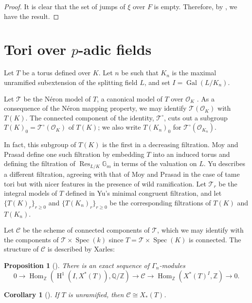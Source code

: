 \documentclass[11pt]{amsart}
\theoremstyle{plain}
\newtheorem{proposition}[theorem]{Proposition}
\newtheorem{corollary}[theorem]{Corollary}
\theoremstyle{definition}
\DeclareMathOperator{\Gal}{Gal}
\DeclareMathOperator{\HH}{H}
\DeclareMathOperator{\Hom}{Hom}
\DeclareMathOperator{\Spec}{Spec}
\DeclareMathOperator{\Res}{Res}
\newcommand{\TT}{\mathcal{T}}
\newcommand{\C}{\mathcal{C}}
\newcommand{\OK}{\mathcal{O}_K}
\newcommand{\OKn}{\mathcal{O}_{K_n}}
\newcommand{\ZZ}{\mathbb{Z}}
\newcommand{\QQ}{\mathbb{Q}}
\newcommand{\Gm}{\mathbb{G}_m}
\begin{document}
\begin{proof}
It is clear that the set of jumps of $\xi$ over $F$ is empty.
Therefore, by \cite[Proposition 21]{bushnell-henniart:10a}, we have the result.
\end{proof}

\section{Tori over $p$-adic fields} \label{section:padic_tori}

Let $T$ be a torus defined over $K$.    Let $n$ be such that $K_n$ is the maximal
unramified subextension of the splitting field $L$, and set $I = \Gal(L/K_n)$.

Let $\TT$ be the N\'eron model of $T$, a canonical model of $T$
over $\OK$ \cite[Ch. 10]{bosch-lutkebohmert-reynaud:NeronModels}.  As a consequence of the N\'eron mapping
property, we may identify $\TT(\OK)$ with $T(K)$.  The connected
component of the identity, $\TT^\circ$, cuts out a subgroup
$T(K)_0 = \TT^\circ(\OK)$ of $T(K)$; we also write $T(K_n)_0$ for
$\TT^\circ(\OKn)$.

In fact, this subgroup of $T(K)$ is the first in a decreasing filtration.
Moy and Prasad \cite{moy-prasad:96a}
define one such filtration by
embedding $T$ into an induced torus and defining the filtration of
$\Res_{L/K} \Gm$ in terms of the valuation on $L$.  Yu \cite[\S 5]{yu:03a}
describes a different filtration, agreeing with that of Moy and Prasad
in the case of tame tori but with nicer features in the presence of wild
ramification.  Let $\TT_r$ be the integral models of $T$ defined in Yu's
minimal congruent filtration, and let $\{T(K)_r\}_{r \ge 0}$ and
$\{T(K_n)_r\}_{r \ge 0}$ be the corresponding filtrations of $T(K)$ and
$T(K_n)$.

Let $\C$ be the scheme of
connected components of $\TT$,
which we may identify with the
components of $\TT \times \Spec(k)$ since $T = \TT \times \Spec(K)$
is connected.  The structure of $\C$ is described by Xarles:

\begin{proposition}[{\cite[Cor. 2.12]{xarles:93a}}]
There is an exact sequence of $\Gamma_n$-modules
$$0 \rightarrow \Hom_{\ZZ}(\HH^1(I, X^*(T)), \QQ/\ZZ) \rightarrow
\C \rightarrow \Hom_{\ZZ}(X^*(T)^I, \ZZ) \rightarrow 0.$$
\end{proposition}

\begin{corollary}[{\cite[Thm. 1.1]{xarles:93a}}] \label{cor:unram_components}
If $T$ is unramified, then $\C \cong X_*(T)$.
\end{corollary}
\end{document}
